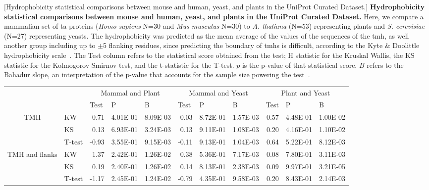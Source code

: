 \begin{table}[htbp]
\centering
{}[Hydrophobicity statistical comparisons between mouse and human, yeast, and plants in the UniProt Curated Dataset.]
{\textbf{Hydrophobicity statistical comparisons between mouse and human, yeast, and plants in the UniProt Curated Dataset.}
Here, we compare a mammalian set of \gls{ta} proteins (\textit{Homo sapiens} N=30 and \textit{Mus musculus} N=30) to \textit{A. thaliana} (N=53) representing plants  and  \textit{S. cerevisiae} (N=27) representing yeasts.
The hydrophobicity was predicted as the mean average of the values of the sequences of the \gls{tmh}, as well another group including up to $\pm$5 flanking residues, since predicting the boundary of \gls{tmh}s is difficult, according to the Kyte \& Doolittle hydrophobicity scale~\cite{Kyte1982}.
The Test column refers to the statistical score obtained from the test; H statistic for the Kruskal Wallis, the KS statistic for the Kolmogorov Smirnov test, and the t-statistic for the T-test.
$p$ is the p\--value of that statistical score.
$B$ refers to the Bahadur slope, an interpretation of the p\--value that accounts for the sample size powering the test~\cite{Bahadur1967, Bahadur1971}.}
    \tiny

    \begin{tabular}{clrrrrrrrrr}
                &       & \multicolumn{3}{c}{Mammal and Plant} & \multicolumn{3}{c}{Mammal and Yeast} & \multicolumn{3}{c}{Plant and Yeast} \\
                &       & \multicolumn{1}{l}{Test} & \multicolumn{1}{l}{P} & \multicolumn{1}{l}{B} & \multicolumn{1}{l}{Test} & \multicolumn{1}{l}{P} & \multicolumn{1}{l}{B} & \multicolumn{1}{l}{Test} & \multicolumn{1}{l}{P} & \multicolumn{1}{l}{B} \\
    \multirow{3}[0]{*}{TMH} &  KW & 0.71  & 4.01E-01 & 8.09E-03 & 0.03  & 8.72E-01 & 1.57E-03 & 0.57  & 4.48E-01 & 1.00E-02 \\
                &  KS & 0.13  & 6.93E-01 & 3.24E-03 & 0.13  & 9.11E-01 & 1.08E-03 & 0.20  & 4.16E-01 & 1.10E-02 \\
                &  T-test & -0.93 & 3.55E-01 & 9.15E-03 & -0.11 & 9.13E-01 & 1.04E-03 & 0.64  & 5.22E-01 & 8.12E-03 \\
    \multirow{3}[0]{*}{TMH and flanks} &  KW & 1.37  & 2.42E-01 & 1.26E-02 & 0.38  & 5.36E-01 & 7.17E-03 & 0.08  & 7.80E-01 & 3.11E-03 \\
                &  KS & 0.19  & 2.40E-01 & 1.26E-02 & 0.14  & 8.13E-01 & 2.38E-03 & 0.09  & 9.97E-01 & 3.21E-05 \\
                &  T-test & -1.17 & 2.45E-01 & 1.24E-02 & -0.79 & 4.35E-01 & 9.58E-03 & 0.20  & 8.43E-01 & 2.14E-03 \\
    \end{tabular}%
                    \label{table:speciestableuniprotstats}
    \end{table}%

